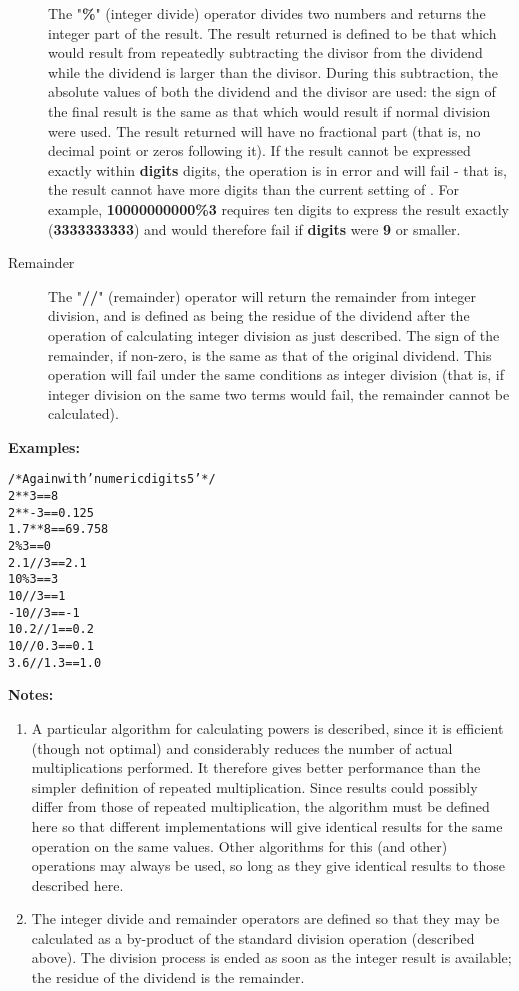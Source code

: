\begin{description}

The "\textbf{\%}" (integer divide) operator divides two numbers
and returns the integer part of the result.
The result returned is defined to be that which would result from
repeatedly subtracting the divisor from the dividend while the dividend
is larger than the divisor.  During this subtraction, the absolute
values of both the dividend and the divisor are used: the sign of the
final result is the same as that which would result if normal division
were used.
 The result returned will have no fractional part (that is, no
decimal point or zeros following it).
If the result cannot be expressed exactly within \textbf{digits}
digits, the operation is in error and will fail - that is, the
result cannot have more digits than the current setting of .
For example, \textbf{10000000000\%3} requires ten digits to express the
result exactly (\textbf{3333333333}) and would therefore fail
if \textbf{digits} were \textbf{9} or smaller.
\item[Remainder]

The "\textbf{//}" (remainder) operator will return the remainder
from integer division, and is defined
as being the residue of the dividend after the operation of calculating
integer division as just described.
The sign of the remainder, if non-zero, is the same as that of the
original dividend.
 This operation will fail under the same conditions as integer
division (that is, if integer division on the same two terms would
fail, the remainder cannot be calculated).
\end{description}
 \textbf{Examples:}
\begin{alltt}
/* Again with 'numeric digits 5' */
2**3        ==  8
2**-3       ==  0.125
1.7**8      ==  69.758
2\%3         ==  0
2.1//3      ==  2.1
10\%3        ==  3
10//3       ==  1
-10//3      ==  -1
10.2//1     ==  0.2
10//0.3     ==  0.1
3.6//1.3    ==  1.0
\end{alltt}
 \textbf{Notes:}
\begin{enumerate}
\item A particular algorithm for calculating powers is described, since
it is efficient (though not optimal) and considerably reduces the
number of actual multiplications performed.
It therefore gives better performance than the simpler definition of
repeated multiplication.
Since results could possibly differ from those of repeated
multiplication, the algorithm must be defined here so that different
implementations will give identical results for the same operation on
the same values.
Other algorithms for this (and other) operations may always be used, so
long as they give identical results to those described here.
\item The integer divide and remainder operators are defined so that they
may be calculated as a by-product of the standard division operation
(described above).  The division process is ended as soon as the
integer result is available; the residue of the dividend is the
remainder.
\end{enumerate}
